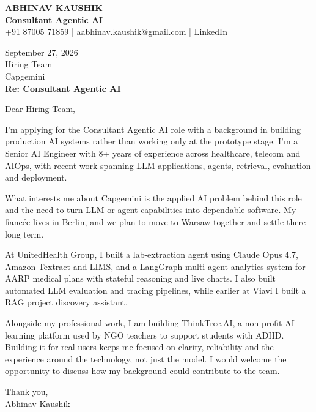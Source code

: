 \documentclass[10pt,a4paper]{article}
\begin{document}
\begin{center}
{\Large\bfseries ABHINAV KAUSHIK}\\[2pt]
{\bfseries Consultant Agentic AI}\\[2pt]
+91 87005 71859 \quad | \quad aabhinav.kaushik@gmail.com \quad | \quad LinkedIn
\end{center}
\vspace{8pt}
September 27, 2026\\[6pt]
Hiring Team\\
Capgemini\\[4pt]
\textbf{Re: Consultant Agentic AI}

Dear Hiring Team,

I’m applying for the Consultant Agentic AI role with a background in building production AI systems rather than working only at the prototype stage. I’m a Senior AI Engineer with 8+ years of experience across healthcare, telecom and AIOps, with recent work spanning LLM applications, agents, retrieval, evaluation and deployment.

What interests me about Capgemini is the applied AI problem behind this role and the need to turn LLM or agent capabilities into dependable software. My fiancée lives in Berlin, and we plan to move to Warsaw together and settle there long term.

At UnitedHealth Group, I built a lab-extraction agent using Claude Opus 4.7, Amazon Textract and LIMS, and a LangGraph multi-agent analytics system for AARP medical plans with stateful reasoning and live charts. I also built automated LLM evaluation and tracing pipelines, while earlier at Viavi I built a RAG project discovery assistant.

Alongside my professional work, I am building ThinkTree.AI, a non-profit AI learning platform used by NGO teachers to support students with ADHD. Building it for real users keeps me focused on clarity, reliability and the experience around the technology, not just the model. I would welcome the opportunity to discuss how my background could contribute to the team.

Thank you,\\
Abhinav Kaushik
\end{document}
